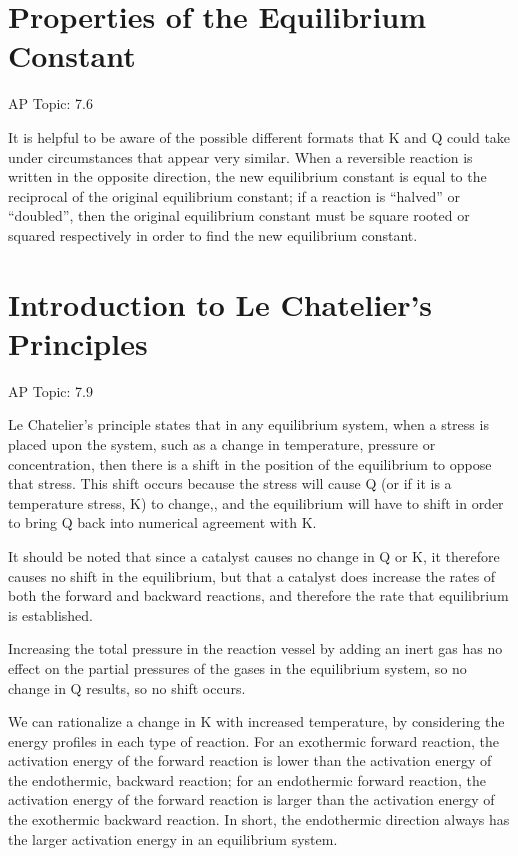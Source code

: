 \documentclass[../chem.tex]{subfiles}
\begin{document}
\section{Properties of the Equilibrium Constant}
AP Topic: 7.6

It is helpful to be aware of the possible different formats that K and Q could take under circumstances that appear very similar. When a reversible 
reaction is written in the opposite direction, the new equilibrium constant is equal to the reciprocal of the original equilibrium constant; if a reaction is
``halved'' or ``doubled'', then the original equilibrium constant must be square rooted or squared respectively in order to find the new equilibrium constant.
\section{Introduction to Le Chatelier's Principles}
AP Topic: 7.9

Le Chatelier's principle states that in any equilibrium system, when a stress is placed upon the system, such as a change in temperature, pressure or concentration,
then there is a shift in the position of the equilibrium to oppose that stress. This shift occurs because the stress will cause Q (or if it is a temperature stress, K) to change,, and the 
equilibrium will have to shift in order to bring Q back into numerical agreement with K.

It should be noted that since a catalyst causes no change in Q or K, it therefore causes no shift in the equilibrium, but that a catalyst does 
increase the rates of both the forward and backward reactions, and therefore the rate that equilibrium is established.

Increasing the total pressure in the reaction vessel by adding an inert gas has no effect on the partial pressures of the gases in the equilibrium system, so no change in Q results, so no shift occurs.

We can rationalize a change in K with increased temperature, by considering the energy profiles in each type of reaction. For an exothermic forward reaction,
the activation energy of the forward reaction is lower than the activation energy of the endothermic, backward reaction; for an endothermic forward reaction, 
the activation energy of the forward reaction is larger than the activation energy of the exothermic backward reaction. In short, the endothermic direction always has the larger activation energy in an equilibrium system.
\end{document}
